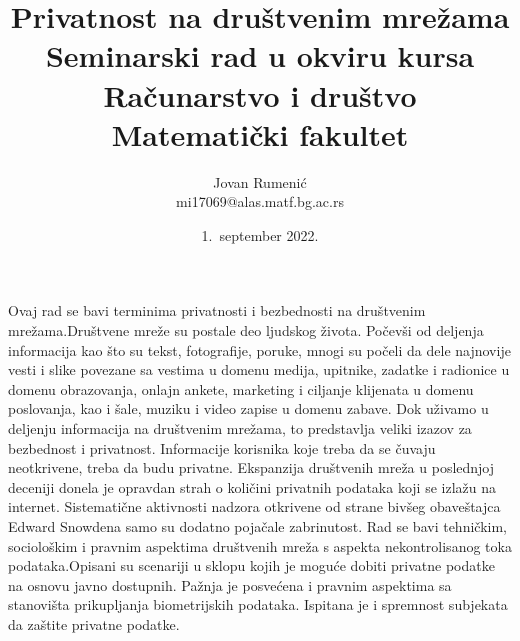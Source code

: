 \documentclass[a4paper]{article}
\begin{document}
\title{Privatnost na društvenim mrežama\\ \small{Seminarski rad u okviru kursa\\Računarstvo i društvo\\ Matematički fakultet}}

\author{Jovan Rumenić\\ mi17069@alas.matf.bg.ac.rs}
\date{1.~september 2022.}
\maketitle

\abstract
\large
Ovaj rad se bavi terminima privatnosti i bezbednosti na društvenim mrežama.Društvene mreže su postale deo ljudskog života. Počevši od deljenja informacija kao što su tekst, fotografije, poruke, mnogi su počeli da dele najnovije vesti i slike povezane sa vestima u domenu medija, upitnike, zadatke i radionice u domenu obrazovanja, onlajn ankete, marketing i ciljanje klijenata u domenu poslovanja, kao i šale, muziku i video zapise u domenu zabave. Dok uživamo u deljenju informacija na društvenim mrežama, to predstavlja veliki izazov za bezbednost i privatnost. Informacije korisnika koje treba da se čuvaju neotkrivene, treba da budu privatne. Ekspanzija društvenih mreža u poslednjoj deceniji donela je opravdan strah o količini privatnih podataka koji se  izlažu  na  internet. Sistematične   aktivnosti nadzora  otkrivene od strane bivšeg obaveštajca Edward Snowdena samo su dodatno pojačale   zabrinutost. Rad se bavi   tehničkim, sociološkim i pravnim aspektima društvenih mreža s aspekta nekontrolisanog toka podataka.Opisani su scenariji u sklopu kojih je moguće dobiti privatne podatke na osnovu javno dostupnih. Pažnja je posvećena i pravnim aspektima sa stanovišta prikupljanja biometrijskih podataka. Ispitana je i spremnost subjekata da zaštite privatne podatke. 

\newpage
\tableofcontents
\newpage
\end{document}
